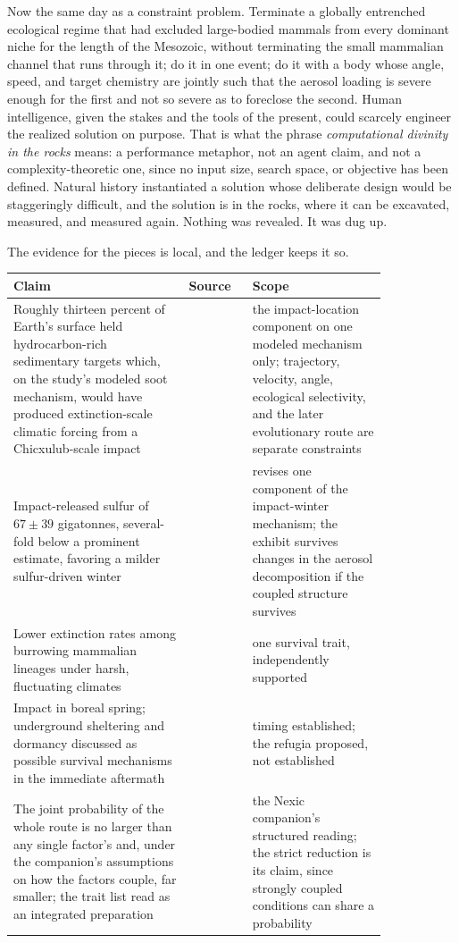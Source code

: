 Now the same day as a constraint problem. Terminate a globally entrenched
ecological regime that had excluded large-bodied mammals from every dominant
niche for the length of the Mesozoic, without terminating the small mammalian
channel that runs through it; do it in one event; do it with a body whose
angle, speed, and target chemistry are jointly such that the aerosol loading
is severe enough for the first and not so severe as to foreclose the second.
Human intelligence, given the stakes and the tools of the present, could
scarcely engineer the realized solution on purpose. That is what the phrase
\emph{computational divinity in the rocks} means: a performance metaphor, not
an agent claim, and not a complexity-theoretic one, since no input size,
search space, or objective has been defined. Natural history instantiated a solution whose
deliberate design would be staggeringly difficult, and the solution is in the
rocks, where it can be excavated, measured, and measured again. Nothing was
revealed. It was dug up.

The evidence for the pieces is local, and the ledger keeps it so.

\begin{center}\small
\begin{tabular}{@{}p{0.47\linewidth}lp{0.36\linewidth}@{}}
\toprule
Claim & Source & Scope\\
\midrule
Roughly thirteen percent of Earth's surface held hydrocarbon-rich sedimentary targets which, on the study's modeled soot mechanism, would have produced extinction-scale climatic forcing from a Chicxulub-scale impact & \cite{Kaiho2017} & the impact-location component on one modeled mechanism only; trajectory, velocity, angle, ecological selectivity, and the later evolutionary route are separate constraints\\
Impact-released sulfur of $67\pm39$ gigatonnes, several-fold below a prominent estimate, favoring a milder sulfur-driven winter & \cite{Nature2025Sulfur} & revises one component of the impact-winter mechanism; the exhibit survives changes in the aerosol decomposition if the coupled structure survives\\
Lower extinction rates among burrowing mammalian lineages under harsh, fluctuating climates & \cite{Burrow25} & one survival trait, independently supported\\
Impact in boreal spring; underground sheltering and dormancy discussed as possible survival mechanisms in the immediate aftermath & \cite{During22} & timing established; the refugia proposed, not established\\
The joint probability of the whole route is no larger than any single factor's and, under the companion's assumptions on how the factors couple, far smaller; the trait list read as an integrated preparation & \cite{Nexus} & the Nexic companion's structured reading; the strict reduction is its claim, since strongly coupled conditions can share a probability\\
\bottomrule
\end{tabular}
\end{center}

